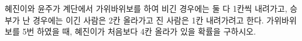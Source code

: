 혜진이와 윤주가 계단에서 가위바위보를 하여 비긴 경우에는 둘 다 1칸씩 내려가고, 승부가 난 경우에는 이긴 사람은 2칸 올라가고 진 사람은 1칸 내려가려고 한다. 가위바위보를 5번 하였을 때, 혜진이가 처음보다 4칸 올라가 있을 확률을 구하시오. 
